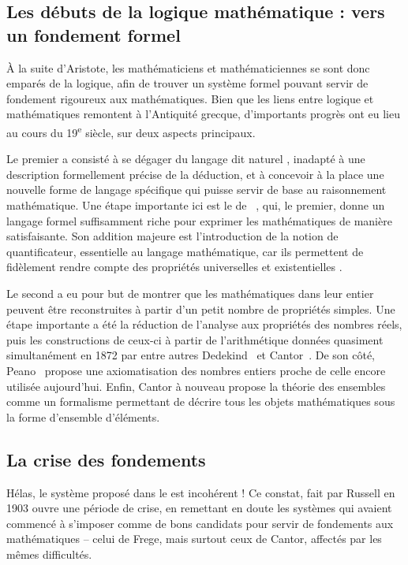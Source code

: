 \subsection{Les débuts de la logique mathématique : vers un fondement formel}

À la suite d’Aristote, les mathématiciens et mathématiciennes se sont donc emparés
de la logique, afin de trouver un système formel
pouvant servir de fondement rigoureux aux mathématiques.
Bien que les liens entre logique et mathématiques remontent à l’Antiquité grecque,
d’importants progrès ont eu lieu au cours
du 19\textsuperscript{e} siècle, sur deux aspects principaux.

Le premier a consisté à se dégager du langage dit
naturel%
, inadapté à une description formellement précise de la déduction, et à
concevoir à la place une nouvelle forme de langage spécifique qui puisse servir de
base au raisonnement mathématique.
Une étape importante ici est le  de
\citeauthor{Begriffsschrift}~,
qui, le premier, donne un langage formel suffisamment riche pour exprimer les mathématiques
de manière satisfaisante. Son addition majeure est l’introduction
de la notion de quantificateur, essentielle au langage mathématique,
car ils permettent de fidèlement rendre compte des propriétés universelles%
et existentielles%
.

Le second a eu pour but de montrer que les mathématiques dans leur entier peuvent
être reconstruites à partir d’un petit nombre de propriétés simples. Une étape
importante a été la réduction de l’analyse aux propriétés
des nombres réels, puis les constructions de ceux-ci à partir
de l’arithmétique données quasiment simultanément en 1872 par entre autres
Dedekind~ et Cantor~.
De son côté, Peano~ propose
une axiomatisation des nombres entiers proche de celle encore utilisée aujourd’hui.
Enfin, Cantor à nouveau propose la théorie des ensembles~
comme un formalisme permettant de décrire tous
les objets mathématiques sous la forme d’ensemble d’éléments.

\subsection{La crise des fondements}
Hélas, le système proposé dans le  est incohérent%
 !
Ce constat, fait par Russell en 1903%
%
ouvre une période de crise, en remettant en doute les systèmes qui avaient commencé à
s’imposer comme de bons candidats pour servir de fondements aux mathématiques –
celui de Frege, mais surtout ceux de Cantor, affectés par les mêmes difficultés.

